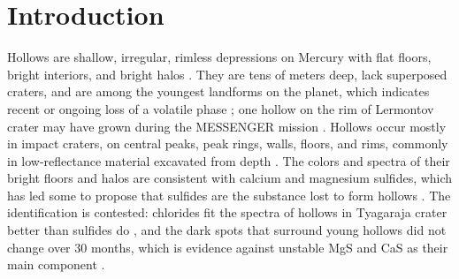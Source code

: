 \documentclass[article,review]{planetary}
\begin{document}
\license{}

\section{Introduction}
Hollows are shallow, irregular, rimless depressions on Mercury with flat floors, bright interiors, and bright halos \parencite{blewett2011,blewett2016,blewett2018}. They are tens of meters deep, lack superposed craters, and are among the youngest landforms on the planet, which indicates recent or ongoing loss of a volatile phase \parencite{blewett2011,wang2020}; one hollow on the rim of Lermontov crater may have grown during the MESSENGER mission \parencite{speyerer2022}. Hollows occur mostly in impact craters, on central peaks, peak rings, walls, floors, and rims, commonly in low-reflectance material excavated from depth \parencite{blewett2013,thomas2014,thomas2016,xiao2013,bickel2025}. The colors and spectra of their bright floors and halos are consistent with calcium and magnesium sulfides, which has led some to propose that sulfides are the substance lost to form hollows \parencite{vilas2016,thomas2016,barraud2020,emran2025}. The identification is contested: chlorides fit the spectra of hollows in Tyagaraja crater better than sulfides do \parencite{lucchetti2021}, and the dark spots that surround young hollows did not change over 30 months, which is evidence against unstable MgS and CaS as their main component \parencite{wang2022}.
\end{document}
